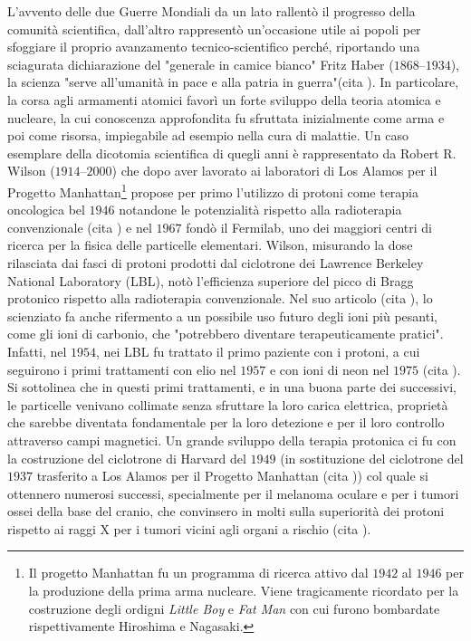 \documentclass[12pt,a4paper,twoside]{report}
\begin{document}
	L'avvento delle due Guerre Mondiali da un lato rallentò il progresso della comunità scientifica, dall'altro rappresentò un'occasione utile ai popoli per sfoggiare il proprio avanzamento tecnico-scientifico perché, riportando una sciagurata dichiarazione del "generale in camice bianco" Fritz Haber ($1868$--$1934$), la scienza "serve all’umanità in pace e alla patria in guerra"(cita
	). In particolare, la corsa agli armamenti atomici favorì un forte sviluppo della teoria atomica e nucleare, la cui conoscenza approfondita fu sfruttata inizialmente come arma e poi come risorsa, impiegabile ad esempio nella cura di malattie. Un caso esemplare della dicotomia scientifica di quegli anni è rappresentato da Robert R. Wilson ($1914$--$2000$) che dopo aver lavorato ai laboratori di Los Alamos per il Progetto Manhattan\footnote{Il progetto Manhattan fu un programma di ricerca attivo dal $1942$ al $1946$ per la produzione della prima arma nucleare. Viene tragicamente ricordato per la costruzione degli ordigni \textit{Little Boy} e \textit{Fat Man} con cui furono bombardate rispettivamente Hiroshima e Nagasaki.} propose per primo l'utilizzo di protoni come terapia oncologica bel $1946$ notandone le potenzialità rispetto alla radioterapia convenzionale (cita
	) e nel $1967$ fondò il Fermilab, uno dei maggiori centri di ricerca per la fisica delle particelle elementari. Wilson, misurando la dose rilasciata dai fasci di protoni prodotti dal ciclotrone dei Lawrence Berkeley National Laboratory (LBL), notò l'efficienza superiore del picco di Bragg protonico rispetto alla radioterapia convenzionale. Nel suo articolo (cita
	), lo scienziato fa anche rifermento a un possibile uso futuro degli ioni più pesanti, come gli ioni di carbonio, che "potrebbero diventare terapeuticamente pratici". Infatti, nel $1954$, nei LBL fu trattato il primo paziente con i protoni, a cui seguirono i primi trattamenti con elio nel $1957$ e con ioni di neon nel $1975$ (cita
	). Si sottolinea che in questi primi trattamenti, e in una buona parte dei successivi, le particelle venivano collimate senza sfruttare la loro carica elettrica, proprietà che sarebbe diventata fondamentale per la loro detezione e per il loro controllo attraverso campi magnetici. Un grande sviluppo della terapia protonica ci fu con la costruzione del ciclotrone di Harvard del $1949$ (in sostituzione del ciclotrone del $1937$ trasferito a Los Alamos per il Progetto Manhattan (cita
	)) col quale si ottennero numerosi successi, specialmente per il melanoma oculare e per i tumori ossei della base del cranio, che convinsero in molti sulla superiorità dei protoni rispetto ai raggi X per i tumori vicini agli organi a rischio (cita
	).
	
\end{document}
